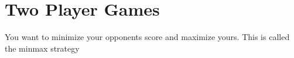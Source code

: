 \documentclass[12pt]{article}
\begin{document}
	
	
	\section{Two Player Games} %
	\label{sec:two_player_games}
	You want to minimize your opponents score and maximize yours. This is called the minmax strategy
\end{document}
